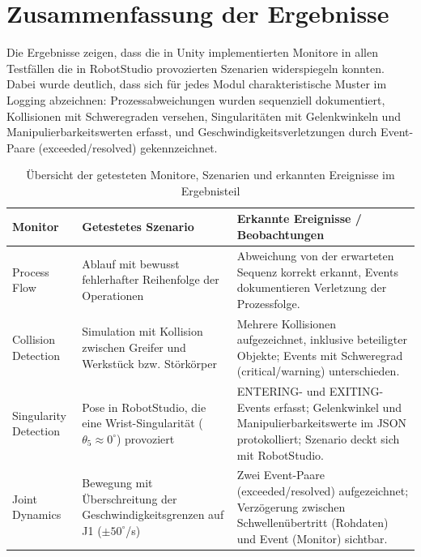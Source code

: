\section{Zusammenfassung der Ergebnisse}
Die Ergebnisse zeigen, dass die in Unity implementierten Monitore in allen Testfällen
die in RobotStudio provozierten Szenarien widerspiegeln konnten.
Dabei wurde deutlich, dass sich für jedes Modul charakteristische Muster
im Logging abzeichnen: Prozessabweichungen wurden sequenziell dokumentiert,
Kollisionen mit Schweregraden versehen, Singularitäten mit Gelenkwinkeln und
Manipulierbarkeitswerten erfasst, und Geschwindigkeitsverletzungen durch
Event-Paare (exceeded/resolved) gekennzeichnet.\\

\begin{table}[H]
	\centering
	\small
	\begin{tabularx}{\textwidth}{lXX}
		\toprule
		\textbf{Monitor}      & \textbf{Getestetes Szenario}                                                               & \textbf{Erkannte Ereignisse / Beobachtungen}                                                                                               \\
		\midrule
		Process Flow          & Ablauf mit bewusst fehlerhafter Reihenfolge der Operationen                                & Abweichung von der erwarteten Sequenz korrekt erkannt, Events dokumentieren Verletzung der Prozessfolge.                                   \\
		\addlinespace
		Collision Detection   & Simulation mit Kollision zwischen Greifer und Werkstück bzw. Störkörper                    & Mehrere Kollisionen aufgezeichnet, inklusive beteiligter Objekte; Events mit Schweregrad (critical/warning) unterschieden.                 \\
		\addlinespace
		Singularity Detection & Pose in RobotStudio, die eine Wrist-Singularität ($\theta_{5} \approx 0^\circ$) provoziert & ENTERING- und EXITING-Events erfasst; Gelenkwinkel und Manipulierbarkeitswerte im JSON protokolliert; Szenario deckt sich mit RobotStudio. \\
		\addlinespace
		Joint Dynamics        & Bewegung mit Überschreitung der Geschwindigkeitsgrenzen auf J1 ($\pm 50^\circ$/s)          & Zwei Event-Paare (exceeded/resolved) aufgezeichnet; Verzögerung zwischen Schwellenübertritt (Rohdaten) und Event (Monitor) sichtbar.       \\
		\bottomrule
	\end{tabularx}
	\caption{Übersicht der getesteten Monitore, Szenarien und erkannten Ereignisse im Ergebnisteil}
	\label{tab:monitor_overview}
\end{table}

